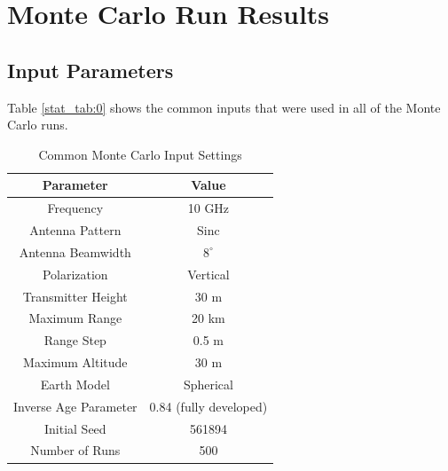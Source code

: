 \section{Monte Carlo Run Results}
\subsection{Input Parameters}
Table \ref{stat_tab:0} shows the common inputs that were used in all of the Monte Carlo runs.
\begin{table}[H]
  \begin{center}
      \renewcommand{\baselinestretch}{1} \small\normalsize
  \begin{quote}
    \caption[Common Monte Carlo Input Settings]{Common Monte Carlo Input Settings\label{stat_tab:1}}
  \end{quote}
  \begin{tabular} {|c | c |}
    \hline
  \bf{Parameter} & \bf{Value} \\ \hline
  Frequency & 10 GHz \\ \hline
  Antenna Pattern & Sinc \\ \hline
  Antenna Beamwidth & $8^{\circ}$  \\ \hline
  Polarization & Vertical \\ \hline
  Transmitter Height & 30 m \\ \hline
  Maximum Range & 20 km \\ \hline
  Range Step & 0.5 m  \\ \hline
  Maximum Altitude & 30 m \\ \hline
  Earth Model & Spherical \\ \hline
  Inverse Age Parameter & 0.84 (fully developed) \\ \hline
  Initial Seed & 561894\\ \hline
  Number of Runs & 500\\ \hline
\end{tabular}
\end{center}
\end{table}
\renewcommand{\baselinestretch}{2} \small\normalsize

